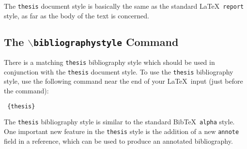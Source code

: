 The \verb+thesis+ document style is basically the same
as the standard \LaTeX\ \verb+report+ style,
as far as the body of the text is concerned.

\subsection {The $\backslash${\tt bibliographystyle} Command}

There is a matching \verb+thesis+ bibliography style
which should be used in conjunction with
the \verb+thesis+ document style.
To use the \verb+thesis+ bibliography style,
use the following \verb++ command
near the end of your \LaTeX\ input
(just before the \verb++ command):

\begin {center} \verb+ {thesis}+ \end {center}

The \verb+thesis+ bibliography style is similar to the
standard Bib\TeX\ \verb+alpha+ style.
One important new feature in the \verb+thesis+ style is
the addition of a new \verb+annote+ field in a reference,
which can be used to produce an annotated bibliography.

